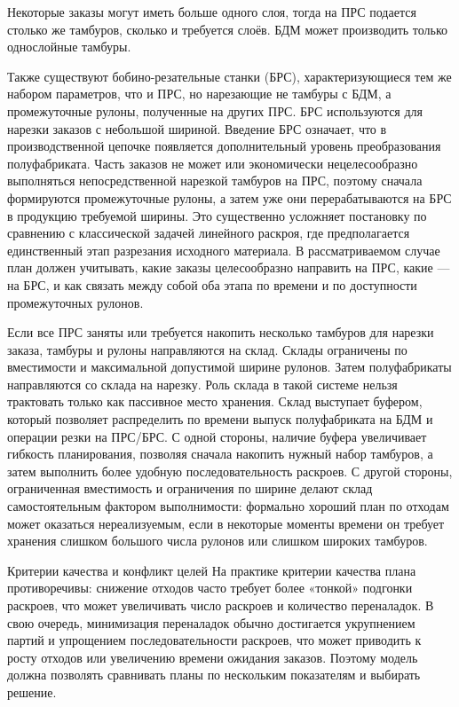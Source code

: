 Некоторые заказы могут иметь больше одного слоя, тогда на ПРС подается столько же тамбуров, сколько и требуется слоёв.
БДМ может производить только однослойные тамбуры.

Также существуют бобино-резательные станки (БРС), характеризующиеся тем же набором параметров, что и ПРС, но нарезающие не тамбуры с БДМ, а промежуточные рулоны, полученные на других ПРС.
БРС используются для нарезки заказов с небольшой шириной.
Введение БРС означает, что в производственной цепочке появляется дополнительный уровень преобразования полуфабриката. Часть заказов не может или экономически нецелесообразно выполняться непосредственной нарезкой тамбуров на ПРС, поэтому сначала формируются промежуточные рулоны, а затем уже они перерабатываются на БРС в продукцию требуемой ширины. Это существенно усложняет постановку по сравнению с классической задачей линейного раскроя, где предполагается единственный этап разрезания исходного материала. В рассматриваемом случае план должен учитывать, какие заказы целесообразно направить на ПРС, какие --- на БРС, и как связать между собой оба этапа по времени и по доступности промежуточных рулонов.

Если все ПРС заняты или требуется накопить несколько тамбуров для нарезки заказа, тамбуры и рулоны направляются на склад.
Склады ограничены по вместимости и максимальной допустимой ширине рулонов.
Затем полуфабрикаты направляются со склада на нарезку.
Роль склада в такой системе нельзя трактовать только как пассивное место хранения. Склад выступает буфером, который позволяет распределить по времени выпуск полуфабриката на БДМ и операции резки на ПРС/БРС. С одной стороны, наличие буфера увеличивает гибкость планирования, позволяя сначала накопить нужный набор тамбуров, а затем выполнить более удобную последовательность раскроев. С другой стороны, ограниченная вместимость и ограничения по ширине делают склад самостоятельным фактором выполнимости: формально хороший план по отходам может оказаться нереализуемым, если в некоторые моменты времени он требует хранения слишком большого числа рулонов или слишком широких тамбуров.

{Критерии качества и конфликт целей}\label{subsec:theor_ch/criteria}
На практике критерии качества плана противоречивы: снижение отходов часто требует более «тонкой» подгонки раскроев, что может увеличивать число раскроев и количество переналадок.
В свою очередь, минимизация переналадок обычно достигается укрупнением партий и упрощением последовательности раскроев, что может приводить к росту отходов или увеличению времени ожидания заказов.
Поэтому модель должна позволять сравнивать планы по нескольким показателям и выбирать решение.

